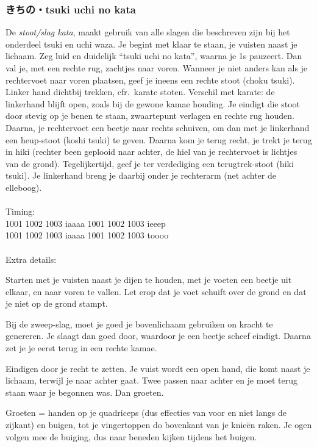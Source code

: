 \subsubsection{きちの・tsuki uchi no kata}
De \textit{stoot/slag kata}, maakt gebruik van alle slagen die beschreven zijn bij het onderdeel tsuki en uchi waza. Je begint met klaar te staan, je vuisten naast je lichaam. Zeg luid en duidelijk ``tsuki uchi no kata'', waarna je 1s pauzeert. Dan val je, met een rechte rug, zachtjes naar voren. Wanneer je niet anders kan als je rechtervoet naar voren plaatsen, geef je ineens een rechte stoot (choku tsuki). Linker hand dichtbij trekken, cfr.\ karate stoten. Verschil met karate: de linkerhand blijft open, zoals bij de gewone kamae houding. Je eindigt die stoot door stevig op je benen te staan, zwaartepunt verlagen en rechte rug houden. Daarna, je rechtervoet een beetje naar rechts schuiven, om dan met je linkerhand een heup-stoot (koshi tsuki) te geven. Daarna kom je terug recht, je trekt je terug in hiki (rechter been geplooid naar achter, de hiel van je rechtervoet is lichtjes van de grond). Tegelijkertijd, geef je ter verdediging een terugtrek-stoot (hiki tsuki). Je linkerhand breng je daarbij onder je rechterarm (net achter de elleboog).\\
\\
Timing:\\
1001 1002 1003 iaaaa 1001 1002 1003 ieeep\\
1001 1002 1003 iaaaa 1001 1002 1003 toooo\\
\\
Extra details:
\begin{itemize}
    \begin{item}
    Starten met je vuisten naast je dijen te houden, met je voeten een beetje uit elkaar, en naar voren te vallen. Let erop dat je voet schuift over de grond en dat je niet op de grond stampt.
    \end{item}
    \begin{item}
    Bij de zweep-slag, moet je goed je bovenlichaam gebruiken on kracht te genereren. Je slaagt dan goed door, waardoor je een beetje scheef eindigt. Daarna zet je je eerst terug in een rechte kamae.
    \end{item}
    \begin{item}
    Eindigen door je recht te zetten. Je vuist wordt een open hand, die komt naast je lichaam, terwijl je naar achter gaat. Twee passen naar achter en je moet terug staan waar je begonnen was. Dan groeten.
    \end{item}
    \begin{item}
    Groeten = handen op je quadriceps (dus effecties van voor en niet langs de zijkant) en buigen, tot je vingertoppen do bovenkant van je knie\"{e}n raken.
    Je ogen volgen mee de buiging, dus naar beneden kijken tijdens het buigen.
    \end{item}
\end{itemize}
